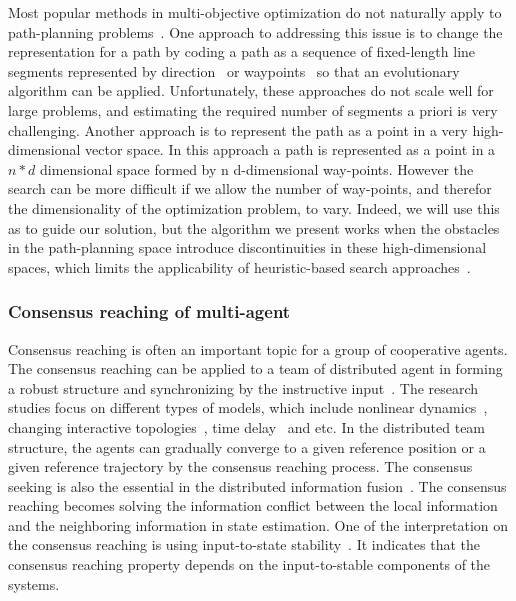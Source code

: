 \documentclass[phd]{byuprop}
\begin{document}
Most popular methods in multi-objective optimization do not naturally apply to path-planning problems~\cite{Zhang2007,Deb2014}.
One approach to addressing this issue is to change the representation for a path by coding a path as a sequence of fixed-length line segments represented by direction~\cite{Ahmed2013,Howlett2006} or waypoints~\cite{Sujit2009,Pires2004} so that an evolutionary algorithm can be applied. 
Unfortunately, these approaches do not scale well for large problems, and estimating the required number of segments a priori is very challenging. 
Another approach is to represent the path as a point in a very high-dimensional vector space.
In this approach a path is represented as a point in a $ n * d $ dimensional space formed by n d-dimensional way-points.
However the search can be more difficult if we allow the number of way-points, and therefor the dimensionality of the optimization problem, to vary. 
Indeed, we will use this as to guide our solution, but the algorithm we present works when the obstacles in the path-planning space introduce discontinuities in these high-dimensional spaces, which limits the applicability of heuristic-based search approaches~\cite{Sujit2009,Zhang2007}.

\subsubsection{Consensus reaching of multi-agent}

Consensus reaching is often an important topic for a group of cooperative agents.
The consensus reaching can be applied to a team of distributed agent in forming a robust structure and synchronizing by the instructive input~\cite{1431045,5990997,5229134,1333204}.
The research studies focus on different types of models, which include nonlinear dynamics~\cite{5229134}, changing interactive topologies~\cite{1431045}, time delay~\cite{1333204} and etc.
In the distributed team structure, the agents can gradually converge to a given reference position or a given reference trajectory by the consensus reaching process.
The consensus seeking is also the essential in the distributed information fusion~\cite{1470210,1470240,sharma2010distributed}.
The consensus reaching becomes solving the information conflict between the local information and the neighboring information in state estimation.
One of the interpretation on the consensus reaching is using input-to-state stability~\cite{1470210}.
It indicates that the consensus reaching property depends on the input-to-stable components of the systems.
\end{document}
